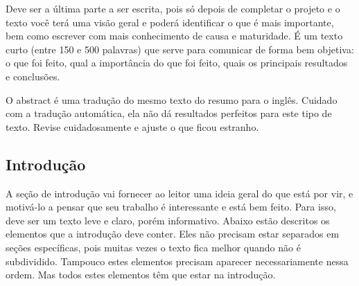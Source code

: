 Deve ser a última parte a ser escrita, pois só depois de completar o projeto e o texto você terá uma visão geral e poderá identificar o que é mais importante, bem como escrever com mais conhecimento de causa e maturidade. É um texto curto (entre 150 e 500 palavras) que serve para comunicar de forma bem objetiva: o que foi feito, qual a importância do que foi feito, quais os principais resultados e conclusões.

O abstract é uma tradução do mesmo texto do resumo para o inglês. Cuidado com a tradução automática, ela não dá resultados perfeitos para este tipo de texto. Revise cuidadosamente e ajuste o que ficou estranho.

\subsection{Introdução}

A seção de introdução vai fornecer ao leitor uma ideia geral do que está por vir, e motivá-lo a pensar que seu trabalho é interessante e está bem feito. Para isso, deve ser um texto leve e claro, porém informativo. Abaixo estão descritos os elementos que a introdução deve conter. Eles não precisam estar separados em seções específicas, pois muitas vezes o texto fica melhor quando não é subdividido. Tampouco estes elementos precisam aparecer necessariamente nessa ordem. Mas todos estes elementos têm que estar na introdução.

